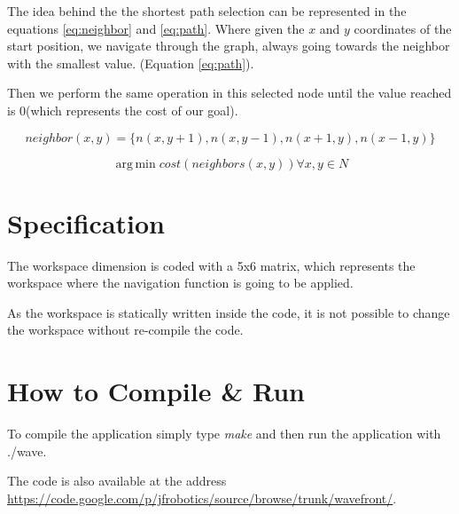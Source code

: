 \documentclass{article}
\begin{document}
The idea behind the the shortest path selection can be represented in
the equations \ref{eq:neighbor} and \ref{eq:path}. Where given the $x$ and
$y$ coordinates of the start position, we navigate through the graph,
always going towards the neighbor with the smallest value.
(Equation \ref{eq:path}).

Then we perform the same operation in this selected node until the value reached is 0(which represents the cost of our goal).
 
\begin{equation}
 neighbor(x,y)=\{n(x,y+1),n(x,y-1),n(x+1,y),n(x-1,y)\}
\label{eq:neighbor}
\end{equation}

\begin{equation}
 \operatorname{arg\,min}cost(neighbors(x,y)) \forall x,y \in N
\label{eq:path}
\end{equation}


\section{Specification}

The workspace dimension is coded with a 5x6 matrix, which represents the workspace where the navigation function is going to be applied. 

As the workspace is statically written inside the code, it is not
possible to change the workspace without re-compile the code. 

\section{How to Compile \& Run}

To compile the application simply type {\it make} and then run the
application with ./wave.

The code is also available at the address \url{https://code.google.com/p/jfrobotics/source/browse/trunk/wavefront/}.
\end{document}
